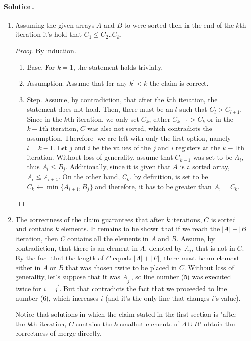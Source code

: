   \paragraph{Solution.}  
  \begin{enumerate}
    \item \begin{claim}
        Assuming the given arrays $A$ and $B$ to  were sorted then in the end of the $k$th iteration it's hold that $C_{1}\le C_{2} .. C_{k}$. 
      \end{claim}
      \begin{proof}
        By induction.\begin{enumerate}
          \item Base. For $k=1$, the statement holds trivially.
          \item Assumption. Assume that for any $k^{\prime} < k$ the claim is correct. 
          \item Step. Assume, by contradiction, that after the $k$th iteration, the statement does not hold. Then, there must be an $l$ such that $C_{l} > C_{l+1}$. Since in the $k$th iteration, we only set $C_{k}$, either $C_{k-1} > C_{k}$ or in the $k-1$th iteration, $C$ was also not sorted, which contradicts the assumption. Therefore, we are left with only the first option, namely $l = k-1$. Let $j$ and $i$ be the values of the $j$ and $i$ registers at the $k-1$th iteration. Without loss of generality, assume that $C_{k-1}$ was set to be $A_{i}$, thus $A_{i} \le B_{j}$. Additionally, since it is given that $A$ is a sorted array, $A_{i} \le A_{i+1}$. On the other hand, $C_{k}$, by definition, is set to be $C_{k} \leftarrow \min \{ A_{i+1}, B_{j} \}$ and therefore, it has to be greater than $A_{i} = C_{k}$.
        \end{enumerate}
      \end{proof}
    \item The correctness of the claim guarantees that after $k$ iterations, $C$ is sorted and contains $k$ elements. It remains to be shown that if we reach the $|A|+|B|$ iteration, then $C$ contains all the elements in $A$ and $B$. Assume, by contradiction, that there is an element in $A$, denoted by $A_{j}$, that is not in $C$. By the fact that the length of $C$ equals $|A| + |B|$, there must be an element either in $A$ or $B$ that was chosen twice to be placed in $C$. Without loss of generality, let's suppose that it was $A_{j^{\prime}}$, so line number (5) was executed twice for $i = j^{\prime}$. But that contradicts the fact that we proceeded to line number (6), which increases $i$ (and it's the only line that changes $i$'s value).

      
Notice that solutions in which the claim stated in the first section is "after the $k$th iteration, $C$ contains the $k$ smallest elements of $A\cup B$" obtain the correctness of merge directly.
\end{enumerate}

